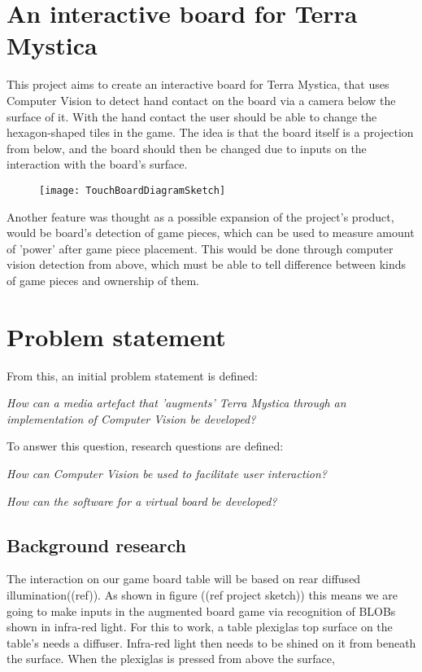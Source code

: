 \section{An interactive board for Terra Mystica}
This project aims to create an interactive board for Terra Mystica, that uses Computer Vision to detect hand contact on the board via a camera below the surface of it. With the hand contact the user should be able to change the hexagon-shaped tiles in the game. The idea is that the board itself is a projection from below, and the board should then be changed due to inputs on the interaction with the board's surface. 

\begin{figure}[!h]
\centering	\texttt{[image: TouchBoardDiagramSketch]}
\end{figure}

Another feature was thought as a possible expansion of the project's product, would be board's detection of game pieces, which can be used to measure amount of 'power' after game piece placement. This would be done through computer vision detection from above, which must be able to tell difference between kinds of game pieces and ownership of them.

\section{Problem statement}
From this, an initial problem statement is defined: 

\textit{How can a media artefact that 'augments' Terra Mystica through an implementation of Computer Vision be developed?}

To answer this question, research questions are defined:

\textit{How can Computer Vision be used to facilitate user interaction?}

\textit{How can the software for a virtual board be developed?}

\subsection{Background research}
The interaction on our game board table will be based on rear diffused illumination((ref)). As shown in figure ((ref project sketch)) this means we are going to make inputs in the augmented board game via recognition of BLOBs shown in infra-red light. 
For this to work, a table plexiglas top surface on the table's needs a diffuser. Infra-red light then needs to be shined on it from beneath the surface. When the plexiglas is pressed from above the surface, 

